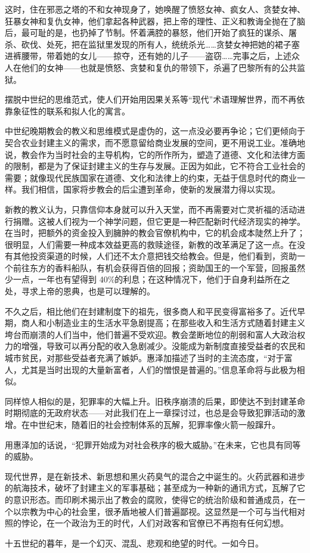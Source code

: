 \begin{tcolorbox}
这时，住在邪恶之塔的不和女神现身了，她唤醒了愤怒女神、疯女人、贪婪女神、狂暴女神和复仇女神，他们拿起各种武器，把上帝的理性、正义和教诲全抛在了脑后，最可耻的是，也扔掉了节制。怀着满腔的暴怒，他们开始了疯狂的谋杀、屠杀、砍伐、处死，把在监狱里发现的所有人，统统杀光……贪婪女神把她的裙子塞进裤腰带，带着她的女儿——掠夺，还有她的儿子——盗窃……完事之后，上述众人在他们的女神——也就是愤怒、贪婪和复仇的带领下，杀遍了巴黎所有的公共监狱。
\end{tcolorbox}

摆脱中世纪的思维范式，使人们开始用因果关系等“现代”术语理解世界，而不再依靠象征性的联系和拟人化的寓言。

中世纪晚期教会的教义和思维模式是虚伪的，这一点没必要再争论；它们更倾向于契合农业封建主义的需求，而不愿意留给商业发展的空间，更不用说工业。准确地说，教会作为当时社会的主导机构，它的所作所为，塑造了道德、文化和法律方面的限制，都是为了保证封建主义的生存与发展。正因为如此，它不符合工业社会的需要；就像现代民族国家在道德、文化和法律上的约束，无益于信息时代的商业一样。我们相信，国家将步教会的后尘遭到革命，使新的发展潜力得以实现。

新教的教义认为，只靠信仰本身就可以升入天堂，而不再需要对亡灵祈福的活动进行捐赠。这被人们视为一个神学问题，但它更是一种匹配新时代经济现实的神学。在当时，把额外的资金投入到臃肿的教会官僚机构中，它的机会成本陡然上升了；很明显，人们需要一种成本效益更高的救赎途径，新教的改革满足了这一点。在没有其他投资渠道的时候，人们还不太介意把钱交给教会。但是，他们看到，资助一个前往东方的香料船队，有机会获得百倍的回报；资助国王的一个军营，回报虽然少一点，一年也有望得到 40\%的利息；在这种情况下，他们于自身利益所在之处，寻求上帝的恩典，也是可以理解的。

不久之后，相比他们在封建制度下的祖先，很多商人和平民变得富裕多了。近代早期，商人和小制造业主的生活水平急剧提高；在那些收入和生活方式随着封建主义垮台而崩溃的人们当中，他们普遍不受欢迎。教会垄断地位的削弱和富人大政治权力的增强，导致可以再分配的收入急剧减少。没能成为新制度直接受益者的农民和城市贫民，对那些受益者充满了嫉妒。惠泽加描述了当时的主流态度，“对于富人，尤其是当时出现的大量新富者，人们的憎恨是普遍的。”信息革命将与此极为相似。

同样惊人相似的是，犯罪率的大幅上升。旧秩序崩溃的后果，即使达不到封建革命时期彻底的无政府状态——对此我们在上一章探讨过，也总是会导致犯罪活动的激增。在中世纪末，随着旧的社会控制体系的瓦解，犯罪率像火箭一般蹿升。

用惠泽加的话说，“犯罪开始成为对社会秩序的极大威胁。”在未来，它也具有同等的威胁。

现代世界，是在新技术、新思想和黑火药臭气的混合之中诞生的。火药武器和进步的航海技术，破坏了封建主义的军事基础；甚至成为一种新的通讯方式，瓦解了它的意识形态。而印刷术揭示出了教会的腐败，使得它的统治阶级和普通成员，在一个以宗教为中心的社会里，很矛盾地被人们普遍鄙视。这显然是一个可与当代相对照的悖论，在一个政治为王的时代，人们对政客和官僚已不再抱有任何幻想。

十五世纪的暮年，是一个幻灭、混乱、悲观和绝望的时代。一如今日。